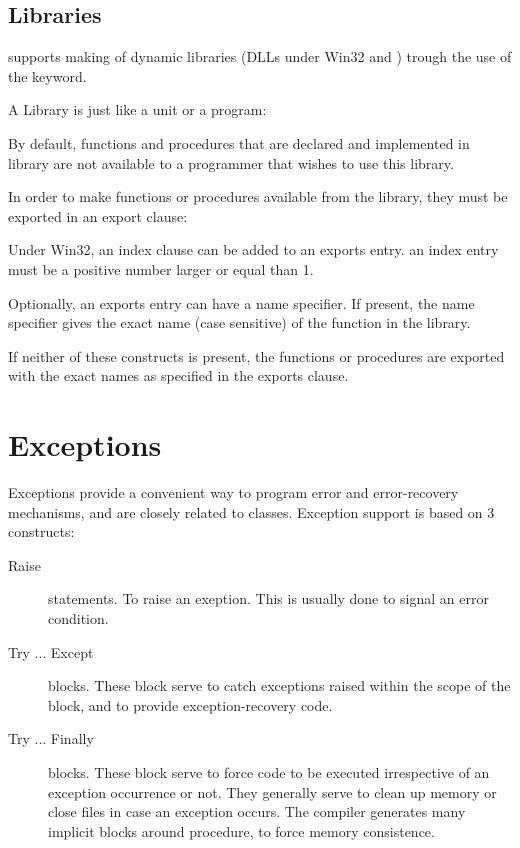 \section{Libraries}
\fpc supports making of dynamic libraries (DLLs under Win32 and \ostwo) trough
the use of the  keyword.

A Library is just like a unit or a program:


By default, functions and procedures that are declared and implemented in
library are not available to a programmer that wishes to use this library.

In order to make functions or procedures available from the library,
they must be exported in an export clause:



Under Win32, an index clause can be added to an exports entry.
an index entry must be a positive number larger or equal than 1.

Optionally, an exports entry can have a name specifier. If present, the name
specifier gives the exact name (case sensitive) of the function in the
library.

If neither of these constructs is present, the functions or procedures
are exported with the exact names as specified in the exports clause.




\chapter{Exceptions}
\label{ch:Exceptions}
Exceptions provide a convenient way to program error and error-recovery
mechanisms, and are closely related to classes.
Exception support is based on 3 constructs:
\begin{description}
\item [Raise\ ] statements. To raise an exeption. This is usually done to signal an
error condition.
\item [Try ... Except\ ] blocks. These block serve to catch exceptions
raised within the scope of the block, and to provide exception-recovery
code.
\item [Try ... Finally\ ] blocks. These block serve to force code to be
executed irrespective of an exception occurrence or not. They generally
serve to clean up memory or close files in case an exception occurs.
The compiler generates many implicit  blocks around
procedure, to force memory consistence.
\end{description}


